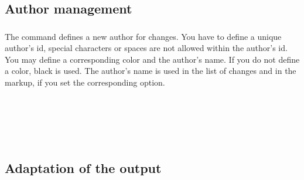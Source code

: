 \begin{chusage}
		\>
\end{chusage}


\subsection{Author management}
\label{sec:user:authormanagement}

\subsubsection{}

The command  defines a new author for changes.
You have to define a unique author's id, special characters or spaces are not allowed within the author's id.
You may define a corresponding color and the author's name.
If you do not define a color, black is used.
The author's name is used in the list of changes and in the markup, if you set the corresponding option.

\begin{chusage}
		\>\\
	\usageexample
		\>\\
		\>\\
		\>\\
		\>
\end{chusage}


\subsection{Adaptation of the output}
\label{sec:user:customizingoutput}


\subsubsection{}
\DescribeMacro{\setaddedmarkup}

